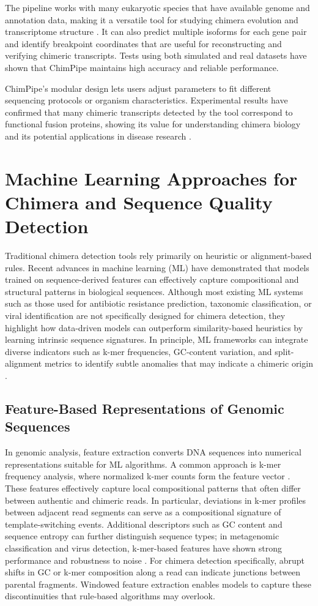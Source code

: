 The pipeline works with many eukaryotic species that have available genome and annotation data, making it a versatile tool for studying chimera evolution and transcriptome structure \citep{Rodriguez2017}. It can also predict multiple isoforms for each gene pair and identify breakpoint coordinates that are useful for reconstructing and verifying chimeric transcripts. Tests using both simulated and real datasets have shown that ChimPipe maintains high accuracy and reliable performance.

ChimPipe’s modular design lets users adjust parameters to fit different sequencing protocols or organism characteristics. Experimental results have confirmed that many chimeric transcripts detected by the tool correspond to functional fusion proteins, showing its value for understanding chimera biology and its potential applications in disease research \citep{Rodriguez2017}.

\section{Machine Learning Approaches for Chimera and Sequence Quality Detection}
Traditional chimera detection tools rely primarily on heuristic or alignment-based rules. Recent advances in machine learning (ML) have demonstrated that models trained on sequence-derived features can effectively capture compositional and structural patterns in biological sequences. Although most existing ML systems such as those used for antibiotic resistance prediction, taxonomic classification, or viral identification are not specifically designed for chimera detection, they highlight how data-driven models can outperform similarity-based heuristics by learning intrinsic sequence signatures. In principle, ML frameworks can integrate diverse indicators such as k-mer frequencies, GC-content variation, and split-alignment metrics to identify subtle anomalies that may indicate a chimeric origin \citep{Arango2018,Liang2020,Ren2020}.

\subsection{Feature-Based Representations of Genomic Sequences}
In genomic analysis, feature extraction converts DNA sequences into numerical representations suitable for ML algorithms. A common approach is k-mer frequency analysis, where normalized k-mer counts form the feature vector \citep{Vervier2015}. These features effectively capture local compositional patterns that often differ between authentic and chimeric reads. In particular, deviations in k-mer profiles between adjacent read segments can serve as a compositional signature of template-switching events. Additional descriptors such as GC content and sequence entropy can further distinguish sequence types; in metagenomic classification and virus detection, k-mer-based features have shown strong performance and robustness to noise \citep{Vervier2015,Ren2020}. For chimera detection specifically, abrupt shifts in GC or k-mer composition along a read can indicate junctions between parental fragments. Windowed feature extraction enables models to capture these discontinuities that rule-based algorithms may overlook.

